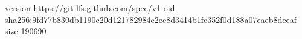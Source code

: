 version https://git-lfs.github.com/spec/v1
oid sha256:9fd77b830db1190c20d121782984e2ec8d3414b1fc352f0d188a07eaeb8deeaf
size 190690
